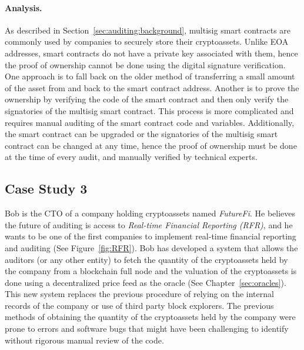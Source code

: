 \paragraph{Analysis.} As described in Section~\ref{sec:auditing:background}, multisig smart contracts are commonly used by companies to securely store their cryptoassets. Unlike EOA addresses, smart contracts do not have a private key associated with them, hence the proof of ownership cannot be done using the digital signature verification. One approach is to fall back on the older method of transferring a small amount of the asset from and back to the smart contract address. Another is to prove the ownership by verifying the code of the smart contract and then only verify the signatories of the multisig smart contract. This process is more complicated and requires manual auditing of the smart contract code and variables. Additionally, the smart contract can be upgraded or the signatories of the multisig smart contract can be changed at any time, hence the proof of ownership must be done at the time of every audit, and manually verified by technical experts. 



\subsection{Case Study 3} \label{sec:auditing:case-studies:valuation} %
Bob is the CTO of a company holding cryptoassets named \textit{FutureFi}. He believes the future of auditing is access to \textit{Real-time Financial Reporting (RFR)}, and he wants to be one of the first companies to implement real-time financial reporting and auditing (See Figure~\ref{fig:RFR}). Bob has developed a system that allows the auditors (or any other entity) to fetch the quantity of the cryptoassets held by the company from a blockchain full node and the valuation of the cryptoassets is done using a decentralized price feed as the oracle (See Chapter~\ref{sec:oracles}). This new system replaces the previous procedure of relying on the internal records of the company or use of third party block explorers. The previous methods of obtaining the quantity of the cryptoassets held by the company were prone to errors and software bugs that might have been challenging to identify without rigorous manual review of the code. 


